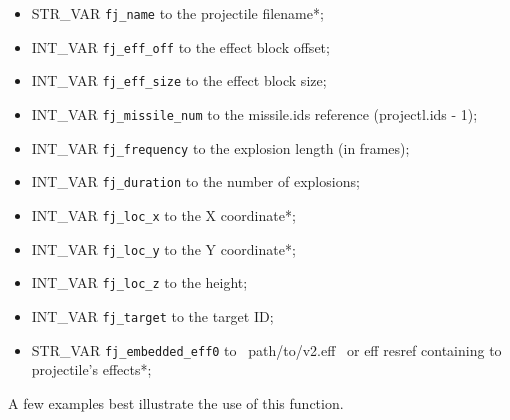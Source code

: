 \documentclass{article}
\begin{document}
\begin{itemize}
\item STR_VAR \verb+fj_name+ to the projectile filename*;
\item INT_VAR \verb+fj_eff_off+ to the effect block offset;
\item INT_VAR \verb+fj_eff_size+ to the effect block size;
\item INT_VAR \verb+fj_missile_num+ to the missile.ids reference (projectl.ids - 1);
\item INT_VAR \verb+fj_frequency+ to the explosion length (in frames);
\item INT_VAR \verb+fj_duration+ to the number of explosions;
\item INT_VAR \verb+fj_loc_x+ to the X coordinate*;
\item INT_VAR \verb+fj_loc_y+ to the Y coordinate*;
\item INT_VAR \verb+fj_loc_z+ to the height;
\item INT_VAR \verb+fj_target+ to the target ID;
\item STR_VAR \verb+fj_embedded_eff0+ to ~path/to/v2.eff~ or eff resref containing to projectile's effects*;
\end{itemize}
A few examples best illustrate the use of this function.
\end{document}
